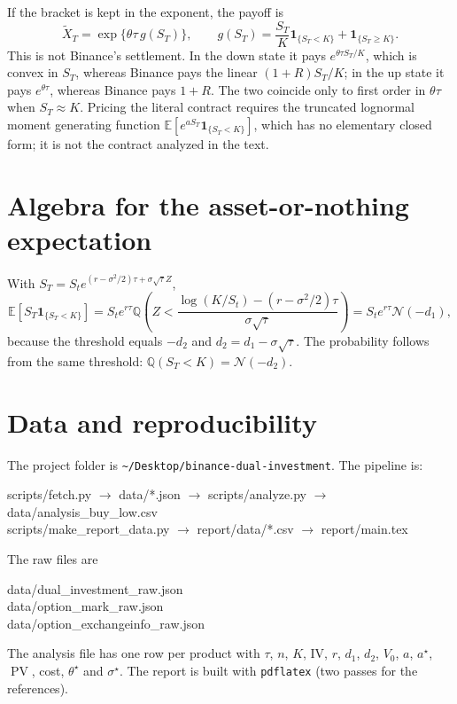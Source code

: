 \documentclass[11pt]{article}
\newcommand{\N}{\mathcal{N}}
\newcommand{\E}{\mathbb{E}}
\newcommand{\Q}{\mathbb{Q}}
\newcommand{\PV}{\operatorname{PV}}
\newcommand{\ind}[1]{\mathbf{1}_{\{#1\}}}
\begin{document}
If the bracket is kept in the exponent, the payoff is
\[
\tilde X_T=\exp\{\theta\tau\,g(S_T)\},
\qquad
g(S_T)=\frac{S_T}{K}\ind{S_T<K}+\ind{S_T\ge K}.
\]
This is not Binance's settlement. In the down state it pays $e^{\theta\tau S_T/K}$, which is convex in $S_T$, whereas Binance pays the linear $(1+R)S_T/K$; in the up state it pays $e^{\theta\tau}$, whereas Binance pays $1+R$. The two coincide only to first order in $\theta\tau$ when $S_T\approx K$. Pricing the literal contract requires the truncated lognormal moment generating function $\E[e^{aS_T}\ind{S_T<K}]$, which has no elementary closed form; it is not the contract analyzed in the text.

\section{Algebra for the asset-or-nothing expectation}\label{app:algebra}

With $S_T=S_t e^{(r-\sigma^2/2)\tau+\sigma\sqrt{\tau}Z}$,
\[
\E[S_T\ind{S_T<K}]
=S_t e^{r\tau}\Q\!\left(Z<\frac{\log(K/S_t)-(r-\sigma^2/2)\tau}{\sigma\sqrt{\tau}}\right)
=S_t e^{r\tau}\N(-d_1),
\]
because the threshold equals $-d_2$ and $d_2=d_1-\sigma\sqrt{\tau}$. The probability follows from the same threshold:
$\Q(S_T<K)=\N(-d_2)$.

\section{Data and reproducibility}\label{app:data}

The project folder is \texttt{\textasciitilde/Desktop/binance-dual-investment}. The pipeline is:
\begin{center}
\small\ttfamily
scripts/fetch.py $\to$ data/*.json $\to$ scripts/analyze.py $\to$ data/analysis\_buy\_low.csv\\
scripts/make\_report\_data.py $\to$ report/data/*.csv $\to$ report/main.tex
\end{center}
The raw files are
\begin{flushleft}
\small\ttfamily
data/dual\_investment\_raw.json\\
data/option\_mark\_raw.json\\
data/option\_exchangeinfo\_raw.json
\end{flushleft}
The analysis file has one row per product with $\tau$, $n$, $K$, IV, $r$, $d_1$, $d_2$, $V_0$, $a$, $a^\star$, $\PV$, cost, $\theta^\star$ and $\sigma^\star$. The report is built with \texttt{pdflatex} (two passes for the references).
\end{document}
